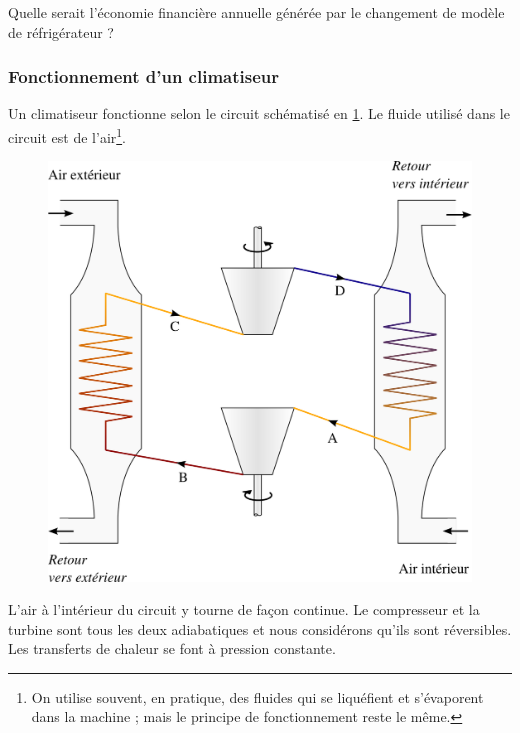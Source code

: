	Quelle serait l’économie financière annuelle générée par le changement de modèle de réfrigérateur ?


\subsubsection{Fonctionnement d’un climatiseur}
\label{exo_fonctionnement_climatiseur}

	Un climatiseur fonctionne selon le circuit schématisé en \cref{fig_exo_climatiseur}. Le fluide utilisé dans le circuit est de l’air\footnote{On utilise souvent, en pratique, des fluides qui se liquéfient et s’évaporent dans la machine ; mais le principe de fonctionnement reste le même.}\nolinebreak.
	
	\begin{figure}
		\begin{center}
		\includegraphics[width=\textwidth]{images/circuit_conditionnement_air.png}
		\end{center}
		\label{fig_exo_climatiseur}
	\end{figure}
	
	L’air à l’intérieur du circuit y tourne de façon continue. Le compresseur et la turbine sont tous les deux adiabatiques et nous considérons qu’ils sont réversibles. Les transferts de chaleur se font à pression constante.

